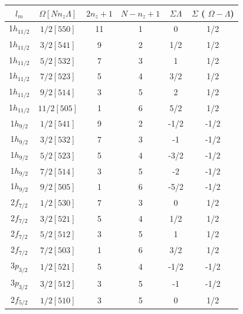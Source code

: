 \documentclass[8pt,a4paper, twoside]{report}
\begin{document}
\begin{table}[htbp]
\center
\begin{tabular}{|c|c|c|c|c|c|}
\toprule
\toprule
$l_m$      & $\Omega[Nn_z\Lambda]$ & $2n_z + 1$ & $N - n_z + 1$ & $\Sigma\Lambda$ & $\Sigma$ ( $\Omega - \Lambda$) \\
\midrule
1$h_{11/2}$ & $1/2[550]$            & 11         & 1             & 0      & 1/2         \\
1$h_{11/2}$ & $3/2[541]$            & 9          & 2             & 1/2      & 1/2         \\
1$h_{11/2}$ & $5/2[532]$            & 7          & 3             & 1       & 1/2        \\
1$h_{11/2}$ & $7/2[523]$            & 5          & 4             & 3/2      & 1/2        \\
1$h_{11/2}$ & $9/2[514]$            & 3          & 5             & 2        & 1/2       \\
1$h_{11/2}$ & $11/2[505]$           & 1          & 6             & 5/2      & 1/2         \\
1$h_{9/2}$ & $1/2[541]$             & 9          & 2             & -1/2      & -1/2         \\
1$h_{9/2}$ & $3/2[532]$             & 7          & 3             & -1     & -1/2          \\
1$h_{9/2}$ & $5/2[523]$             & 5          & 4             & -3/2      & -1/2         \\
1$h_{9/2}$ & $7/2[514]$             & 3          & 5             & -2        & -1/2       \\
1$h_{9/2}$ & $9/2[505]$             & 1          & 6             & -5/2      & -1/2         \\
2$f_{7/2}$ & $1/2[530]$             & 7          & 3             & 0        & 1/2       \\
2$f_{7/2}$ & $3/2[521]$             & 5          & 4             & 1/2      & 1/2         \\
2$f_{7/2}$ & $5/2[512]$             & 3          & 5             & 1        & 1/2       \\
2$f_{7/2}$ & $7/2[503]$             & 1          & 6             & 3/2       & 1/2        \\
3$p_{3/2}$ & $1/2[521]$             & 5          & 4             & -1/2     & -1/2          \\
3$p_{3/2}$ & $3/2[512]$             & 3          & 5             & -1       & -1/2        \\
2$f_{5/2}$ & $1/2[510]$             & 3          & 5             & 0      & 1/2         \\

\end{tabular}
\end{table}
\end{document}
